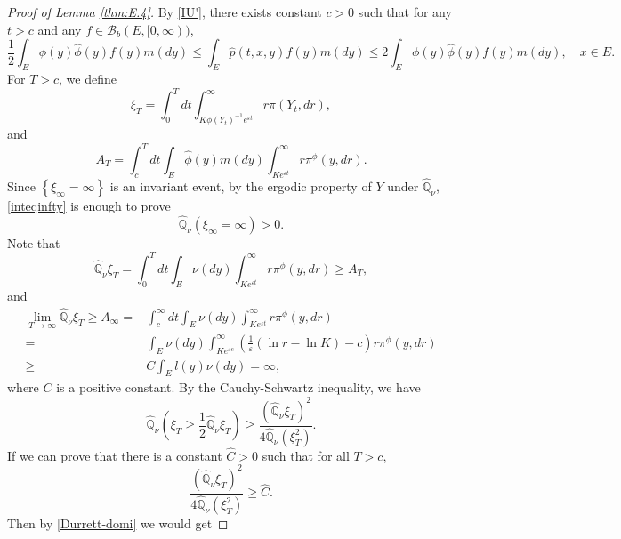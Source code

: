 \documentclass[12pt,a4paper]{amsart}
\numberwithin{equation}{section}
\theoremstyle{plain}
\theoremstyle{definition}
\theoremstyle{remark}
\begin{document}
\begin{proof}[Proof of Lemma \ref{thm:E.4}]
By \eqref{IU'}, there exists constant $c>0$ such that for
any $t>c$ and any
$f\in \mathcal B_b(E,[0,\infty))$,
\begin{equation}\label{domi-p}
 \frac{1}{2}\int_E\phi(y)\widehat{\phi}(y)f(y)m(dy)\leq \int_E\hat p(t, x, y)f(y)m(dy)\leq 2\int_E\phi(y)\widehat{\phi}(y)f(y)m(dy),\quad x\in E.
\end{equation}
For $T>c$, we define
$$
 \xi_T=\int_0^T dt\int_{K\phi(Y_t)^{-1}e^{\varepsilon t}}^\infty r\pi(Y_t, dr),
$$
and
$$
 A_T=\int_c^Tdt\int_E\widehat{\phi}(y)m(dy)\int_{K e^{\varepsilon t}}^\infty r\pi^\phi(y, dr).
$$
Since $\left\{\xi_\infty=\infty\right\}$ is an invariant event, by
the ergodic property of $Y$ under $\widehat{\mathbb Q}_{\nu}$, \eqref{inteqinfty} is
enough to prove
\begin{equation}\label{positive-prob}
\widehat{\mathbb Q}_{\nu}\left(\xi_\infty=\infty\right)>0.
\end{equation}
Note that
\begin{equation}\label{domi-mean}
 \widehat{\mathbb Q}_{\nu} \xi_T=\int_0^Tdt\int_E\nu(dy)\int_{K e^{\varepsilon t}}^\infty r\pi^\phi(y, dr)\ge A_T,
\end{equation}
and
\begin{equation}\label{mean-limit}
\begin{array}{rl}
\lim_{T\rightarrow\infty}\widehat{\mathbb Q}_{\nu}\xi_T\ge A_\infty
=&\displaystyle\int_c^\infty dt\int_E \nu(dy)\int_{K e^{\varepsilon t}}^\infty r \pi^\phi(y, dr)\\
=&\displaystyle\int_E\nu(dy)\int_{Ke^{\varepsilon c}}^\infty \left(\frac{1}{\varepsilon}(\ln r-\ln K)-c\right)r\pi^\phi(y, dr)\\
\ge&\displaystyle C\int_El(y)\nu(dy)=\infty,
\end{array}
\end{equation}
where $C$ is a positive constant.
By  the Cauchy-Schwartz inequality, we have
\begin{equation}\label{Durrett-domi}
\widehat{\mathbb Q}_{\nu}\left(\xi_T\geq \frac{1}{2}\widehat{\mathbb Q}_{\nu}
\xi_T\right)\geq \frac{(\widehat{\mathbb Q}_{\nu}
\xi_T)^2}{4\widehat{\mathbb Q}_{\nu}(\xi_T^2)}.
\end{equation}
If we can prove that there is a constant $\widehat C>0$ such that
for all $T>c,$
\begin{equation}\label{uniform lower bound}
\frac{(\widehat{\mathbb Q}_{\nu}
\xi_T)^2}{4\widehat{\mathbb Q}_{\nu}(\xi_T^2)}\geq \widehat C.
\end{equation}
Then by \eqref{Durrett-domi} we would get

\end{proof}
\end{document}
